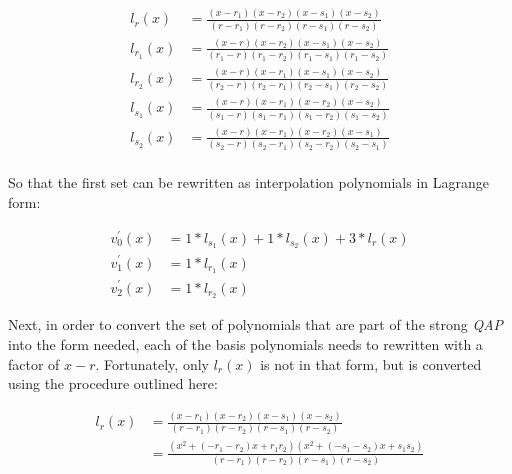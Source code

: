 \documentclass{article}
\begin{document}
\begin{align*}
    l_{r}(x) &= \frac{ (x  - r_{1}) (x  - r_{2}) (x  - s_{1}) (x  - s_{2})}{(r  - r_{1}) (r  - r_{2}) (r  - s_{1}) (r  - s_{2})} \\
    l_{r_{1}}(x) &= \frac{(x  -  r) (x  - r_{2}) (x  - s_{1}) (x  - s_{2})}{(r_{1} -  r) (r_{1} - r_{2}) (r_{1} - s_{1}) (r_{1} - s_{2})} \\
    l_{r_{2}}(x) &= \frac{(x  -  r) (x  - r_{1}) (x  - s_{1}) (x  - s_{2})}{(r_{2} -  r) (r_{2} - r_{1}) (r_{2} - s_{1}) (r_{2} - s_{2})} \\
    l_{s_{1}}(x) &= \frac{(x  -  r) (x  - r_{1}) (x - r_{2}) (x  - s_{2})}{(s_{1} -  r) (s_{1} - r_{1}) (s_{1} - r_{2}) (s_{1} - s_{2})} \\
    l_{s_{2}}(x) &= \frac{(x  -  r) (x  - r_{1}) (x  - r_{2}) (x  - s_{1})}{(s_{2} -  r) (s_{2} - r_{1}) (s_{2} - r_{2}) (s_{2} - s_{1})} \\
\end{align*}

\noindent So that the first set can be rewritten as interpolation polynomials in Lagrange form:

\begin{align*}
    v^{'}_{0}(x) &= 1 * l_{s_{1}}(x) + 1 * l_{s_{2}}(x) + 3 * l_{r}(x) \\
    v^{'}_{1}(x) &= 1 * l_{r_{1}}(x) \\
    v^{'}_{2}(x) &= 1 * l_{r_{2}}(x)
\end{align*}

\noindent Next, in order to convert the set of polynomials that are part of the strong \textit{QAP} into the form
needed, each of the basis polynomials needs to rewritten with a factor of $ x - r $. Fortunately, only $ l_{r}(x) $ is
not in that form, but is converted using the procedure outlined here: 


\begin{align*}
    l_{r}(x) &= \frac{(x  - r_{1}) (x  - r_{2}) (x  - s_{1}) (x  - s_{2})}{(r  - r_{1}) (r  - r_{2}) (r  - s_{1}) (r  - s_{2})} \\
    &= \frac{(x^{2} + (-r_{1} - r_{2}) x + r_{1} r_{2}) (x^{2} + (-s_{1} - s_{2}) x + s_{1} s_{2})}{(r  - r_{1}) (r  - r_{2}) (r  - s_{1}) (r  - s_{2})}
\end{align*}

\end{document}

